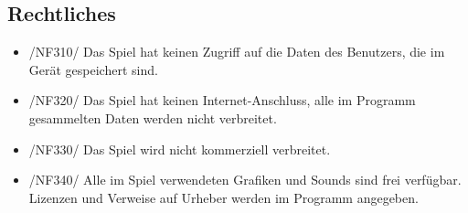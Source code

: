 \subsection{Rechtliches}
\begin{itemize}
\item /NF310/ Das Spiel hat keinen Zugriff auf die Daten des Benutzers, die im Gerät gespeichert sind.
\item /NF320/ Das Spiel hat keinen Internet-Anschluss, alle im Programm gesammelten Daten werden nicht verbreitet.
\item /NF330/ Das Spiel wird nicht kommerziell verbreitet.
\item /NF340/ Alle im Spiel verwendeten Grafiken und Sounds sind frei verfügbar. Lizenzen und Verweise auf Urheber werden im Programm angegeben.
\end{itemize}
